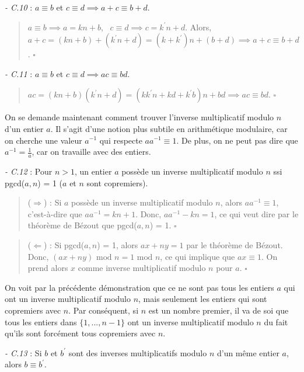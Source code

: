 \textit{- C.10} : $a \equiv b$ et $c \equiv d \implies a+c \equiv b + d$.

\begin{quote}
    $a \equiv b \implies a = kn + b$, \ $c \equiv d \implies c = k^{'}n + d$. Alors, $a + c = (kn + b) + (k^{'}n + d) = (k + k^{'})n + (b + d) \implies a + c \equiv b + d$. $\square$
\end{quote}

\textit{- C.11} : $a \equiv b$ et $c \equiv d \implies ac \equiv bd$.

\begin{quote}
    $ac = (kn + b)(k^{'}n + d) = (kk^{'}n + kd + k^{'}b)n + bd \implies ac \equiv bd$. $\square$
\end{quote}

On se demande maintenant comment trouver l'inverse multiplicatif modulo $n$ d'un entier $a$. Il s'agit d'une notion plus subtile en arithmétique modulaire, car on cherche une valeur $a^{-1}$ qui respecte $aa^{-1} \equiv 1$. De plus, on ne peut pas dire que $a^{-1} = \frac{1}{a}$, car on travaille avec des entiers.

\textit{- C.12} : Pour $n > 1$, un entier $a$ possède un inverse multiplicatif modulo $n$ ssi pgcd($a,n$) = 1 ($a$ et $n$ sont copremiers). 

\begin{quote}
    ($\Longrightarrow$) : Si $a$ possède un inverse multiplicatif modulo $n$, alors $aa^{-1} \equiv 1$, c'est-à-dire que $aa^{-1} = kn + 1$. Donc, $aa^{-1} - kn = 1$, ce qui veut dire par le théorème de Bézout que pgcd($a,n$) = 1. $\square$
\end{quote}

\begin{quote}
    ($\Longleftarrow$) : Si pgcd($a,n$) = 1, alors $ax + ny = 1$ par le théorème de Bézout. Donc, $(ax+ny) \text{ mod } n = 1 \text{ mod } n$, ce qui implique que $ax \equiv 1 $. On prend alors $x$ comme inverse multiplicatif modulo $n$ pour $a$. $\square$
\end{quote}

On voit par la précédente démonstration que ce ne sont pas tous les entiers $a$ qui ont un inverse multiplicatif modulo $n$, mais seulement les entiers qui sont copremiers avec $n$. Par conséquent, si $n$ est un nombre premier, il va de soi que tous les entiers dans $\{1, ..., n-1\}$ ont un inverse multiplicatif modulo $n$ du fait qu'ils sont forcément tous copremiers avec $n$.

\textit{- C.13} : Si $b$ et $b^{'}$ sont des inverses multiplicatifs modulo $n$ d'un même entier $a$, alors $b \equiv b^{'}$.

